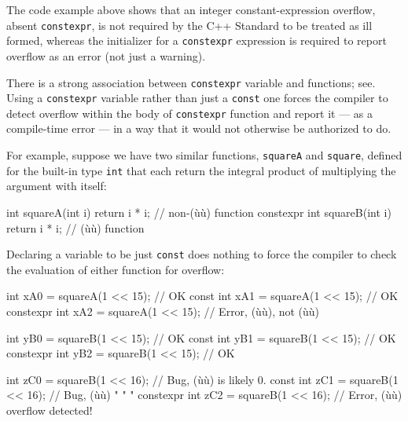 \noindent The code example above shows that an integer constant-expression
overflow, absent \lstinline!constexpr!, is not required by the C++ Standard
to be treated as ill formed, whereas the initializer for a
\lstinline!constexpr! expression is required to report overflow as an error
(not just a warning).

There is a strong association between \lstinline!constexpr! variable and
functions; see\linebreak[4]%
. Using a
\lstinline!constexpr! variable rather than just a \lstinline!const! one forces the
compiler to detect overflow within the body of \lstinline!constexpr!
function and report it --- as a compile-time error --- in a way that it
would not otherwise be authorized to do.

For example, suppose we have two similar functions, \lstinline!squareA! and
\lstinline!square!, defined for the built-in type \lstinline!int! that each return the integral product of multiplying the
argument with itself:

\begin{emcppslisting}[emcppsbatch=e2]
          int squareA(int i) { return i * i; }  // non-(ù{}ù) function
constexpr int squareB(int i) { return i * i; }  // (ù{}ù) function
\end{emcppslisting}
    
\noindent Declaring a variable to be just \lstinline!const! does nothing to force the
compiler to check the evaluation of either function for overflow:

\begin{emcppslisting}[emcppsbatch=e2]
                int xA0 = squareA(1 << 15);  // OK
          const int xA1 = squareA(1 << 15);  // OK
constexpr       int xA2 = squareA(1 << 15);  // Error, (ù{}ù), not (ù{}ù)

                int yB0 = squareB(1 << 15);  // OK
          const int yB1 = squareB(1 << 15);  // OK
constexpr       int yB2 = squareB(1 << 15);  // OK

                int zC0 = squareB(1 << 16);  // Bug, (ù{}ù) is likely 0.
          const int zC1 = squareB(1 << 16);  // Bug, (ù{}ù)  "   "    "
constexpr       int zC2 = squareB(1 << 16);  // Error, (ù{}ù) overflow detected!
\end{emcppslisting}
    
